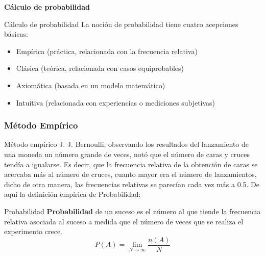 \documentclass[11pt]{beamer}
\begin{document}
        \begin{frame}{}
            \begin{center}
                \textbf{\huge Cálculo de probabilidad}
            \end{center}
        \end{frame}

        \begin{frame}{Cálculo de probabilidad}
            La noción de probabilidad tiene cuatro acepciones básicas:
            \\
            \begin{itemize}[]
                \item Empírica (práctica, relacionada con la frecuencia relativa)
                \item Clásica (teórica, relacionada con casos equiprobables)
                \item Axiomática (basada en un modelo matemático)
                \item Intuitiva (relacionada con experiencias o mediciones subjetivas)
            \end{itemize}
        \end{frame}






        \subsubsection*{Método Empírico}
          \begin{frame}{Método empírico}
            J. J. Bernoulli, observando los resultados del lanzamiento de una moneda un número grande de veces, notó que el número de caras y cruces tendía a igualarse. Es decir, que la frecuencia relativa de la obtención de caras se acercaba más al número de cruces, cuanto mayor era el número de lanzamientos, dicho de otra manera, las frecuencias relativas se parecían cada vez más a 0.5. De aquí la definición empírica de Probabilidad:
            \begin{block}{Probabilidad}
               \textbf{Probabilidad} de un suceso es el número al que tiende la frecuencia relativa asociada al suceso a medida que el número de veces que se realiza el experimento crece.
               $$P(A) = \lim_{N \to \infty }\dfrac{n(A)}{N} $$
            \end{block}
          \end{frame}
\end{document}
